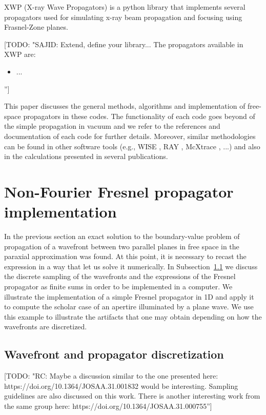 \documentclass{iucr}              %
\newcommand{\todo}[1]{{\color{red}[TODO: "#1'']}}
\begin{document}
XWP (X-ray Wave Propagators) is a python library that implements several propagators used for simulating x-ray beam propagation and focusing using Frasnel-Zone planes. \todo{SAJID: Extend, define your library...
The propagators available in XWP are: 
\begin{itemize}
    \item ...
\end{itemize}
}

This paper discusses the general methods, algorithms and implementation of free-space propagators in these codes. The functionality of each code goes beyond of the simple propagation in vacuum and we refer to the references and documentation of each code for further details. Moreover, similar methodologies can be found in other software tools (e.g., WISE \cite{wise}, RAY \cite{RAY}, McXtrace \cite{mcxtrace}, ...) and also in the calculations presented in several publications.


\section{Non-Fourier Fresnel propagator implementation}
\label{ch: non-fourier-propagators}

In the previous section an exact solution to the boundary-value problem of propagation of a wavefront between two parallel planes in free space in the paraxial approximation was found. At this point, it is necessary to recast the expression in a way that let us solve it numerically. In Subsection~\ref{subch: discretization} we discuss the discrete sampling of the wavefronts and the expressions of the Fresnel propagator as finite sums in order to be implemented in a computer. We illustrate the implementation of a simple Fresnel propagator in 1D and apply it to compute the scholar case of an apertire illuminated by a plane wave. We use this example to illustrate the artifacts that one may obtain depending on how the wavefronts are discretized.


\subsection{Wavefront and propagator discretization}
\label{subch: discretization}
\todo{RC: Maybe a discussion similar to the one presented here: https://doi.org/10.1364/JOSAA.31.001832 would be interesting. Sampling guidelines are also discussed on this work. There is another interesting work from the same group here: https://doi.org/10.1364/JOSAA.31.000755}
\end{document}
